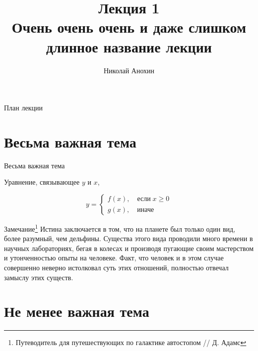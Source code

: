 \documentclass[10pt]{beamer}
\author{Николай Анохин}
\title{\newline \newline \newline Лекция 1 \\ Очень очень очень и даже слишком \\ длинное название лекции}
\let\otp\titlepage
\renewcommand{\titlepage}{\otp\addtocounter{framenumber}{-1}}
\begin{document}
\begin{frame}[plain]
\titlepage
\end{frame}

\begin{frame}{План лекции}
\tableofcontents
\end{frame}

\section{Весьма важная тема}

\begin{frame}{Весьма важная тема}

Уравнение, связывающее $y$ и $x$,

\[
y = \begin{cases}
f(x),\quad\text{если}\;x \geqslant 0 \\
g(x),\quad\text{иначе}
\end{cases}
\]

\begin{alertblock}{Замечание\footnote{Путеводитель для путешествующих по галактике автостопом // Д. Адамс}}
Истина заключается в том, что на планете был только один вид, более разумный, чем дельфины. Существа этого вида проводили много времени в научных лабораториях, бегая в колесах и производя пугающие своим мастерством и утонченностью опыты на человеке. Факт, что человек и в этом случае совершенно неверно истолковал суть этих отношений, полностью отвечал замыслу этих существ.
\end{alertblock}

\end{frame}

\section{Не менее важная тема}
\end{document}
